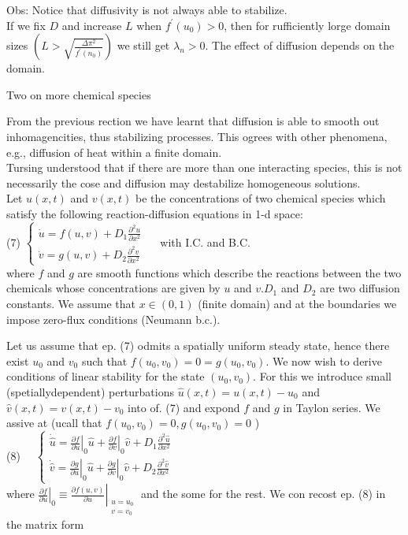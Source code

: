 \documentclass[10pt]{article}
\begin{document}
Obs: Notice that diffusivity is not always able to stabilize.\\
If we fix $D$ and increase $L$ when $f^{\prime}\left(u_{0}\right)>0$, then for rufficiently lorge domain sizes $\left(L>\sqrt{\frac{\Delta \pi^{2}}{f^{\prime}\left(n_{0}\right)}}\right)$ we still get $\lambda_{n}>0$. The effect of diffusion depends on the domain.

Two on more chemical species

From the previous rection we have learnt that diffusion is able to smooth out inhomagencities, thus stabilizing processes. This ogrees with other phenomena, e.g., diffusion of heat within a finite domain.\\
Tursing understood that if there are more than one interacting species, this is not necessarily the cose and diffusion may destabilize homogeneous solutions.\\
Let $u(x, t)$ and $v(x, t)$ be the concentrations of two chemical species which satisfy the following reaction-diffusion equations in 1-d space:\\
(7) $\left\{\begin{array}{l}\dot{u}=f(u, v)+D_{1} \frac{\partial^{2} u}{\partial x^{2}} \\ \dot{v}=g(u, v)+D_{2} \frac{\partial^{2} v}{\partial x^{2}}\end{array} \quad\right.$ with I.C. and B.C.\\
where $f$ and $g$ are smooth functions which describe the reactions between the two chemicals whose concentrations are given by $u$ and $v . D_{1}$ and $D_{2}$ are two diffusion constants. We assume that $x \in(0,1)$ (finite domain) and at the boundaries we impose zero-flux conditions (Neumann b.c.).

Let us assume that ep. (7) odmits a spatially uniform steady state, hence there exist $u_{0}$ and $v_{0}$ such that $f\left(u_{0}, v_{0}\right)=0=g\left(u_{0}, v_{0}\right)$. We now wish to derive conditions of linear stability for the state $\left(u_{0}, v_{0}\right)$. For this we introduce small (spetiallydependent) perturbations $\hat{u}(x, t)=u(x, t)-u_{0}$ and $\hat{v}(x, t)=v(x, t)-v_{0}$ into of. (7) and expond $f$ and $g$ in Taylon series. We assive at (ucall that $f\left(u_{0}, v_{0}\right)=0, g\left(u_{0}, v_{0}\right)=0$ )\\
(8) $\quad\left\{\begin{array}{l}\dot{\hat{u}}=\left.\frac{\partial f}{\partial u}\right|_{0} \hat{u}+\left.\frac{\partial f}{\partial v}\right|_{0} \hat{v}+D_{1} \frac{\partial^{2} \hat{u}}{\partial x^{2}} \\ \dot{\hat{v}}=\left.\frac{\partial g}{\partial u}\right|_{0} \hat{u}+\left.\frac{\partial g}{\partial v}\right|_{0} \hat{v}+D_{2} \frac{\partial^{2} \hat{v}}{\partial x^{2}}\end{array}\right.$\\
where $\left.\left.\frac{\partial f}{\partial u}\right|_{0} \equiv \frac{\partial f(u, v)}{\partial u}\right|_{\substack{u=u_{0} \\ v=v_{0}}}$ and the some for the rest. We con recost ep. (8) in the matrix form
\end{document}
